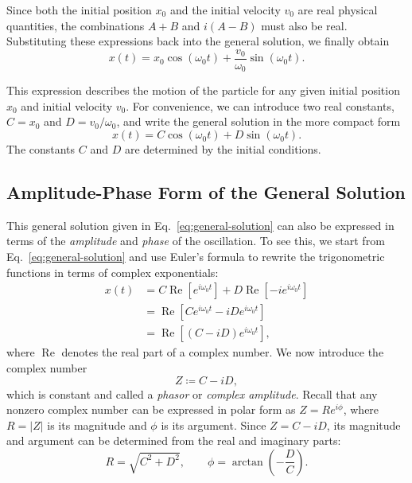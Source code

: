 \documentclass[12pt]{article}
\begin{document}
Since both the initial position $x_0$ and the initial velocity $v_0$ are real physical quantities, the combinations $A+B$ and $i(A-B)$ must also be real. Substituting these expressions back into the general solution, we finally obtain
\begin{equation}
    x(t)=x_0\cos(\omega_0 t)
    +\frac{v_0}{\omega_0}\sin(\omega_0 t).
\end{equation}

This expression describes the motion of the particle
for any given initial position $x_0$ and initial
velocity $v_0$. For convenience, we can introduce two real constants,
$C=x_0$ and $D=v_0/\omega_0$, and write the general
solution in the more compact form
\begin{equation}
    x(t)=C\cos(\omega_0 t)+D\sin(\omega_0 t).
    \label{eq:general-solution}
\end{equation}
The constants $C$ and $D$ are determined by the initial conditions. 

\subsection{Amplitude-Phase Form of the General Solution}

This general solution given in Eq.~\ref{eq:general-solution} can also be expressed in terms of the \emph{amplitude} and \emph{phase} of the oscillation. To see this, we start from Eq.~\ref{eq:general-solution} and use Euler's formula to rewrite the trigonometric functions in terms of complex exponentials:
\begin{align}
    x(t)
    &=C\operatorname{Re}\left[e^{i\omega_0 t}\right]+D\operatorname{Re}\left[-i e^{i\omega_0 t}\right]\nonumber\\
    &=\operatorname{Re}\left[
    Ce^{i\omega_0 t}-iDe^{i\omega_0 t}
    \right]\nonumber\\
    &=\operatorname{Re}\left[
    (C-iD)e^{i\omega_0 t}
    \right],
\end{align}
where $\operatorname{Re}$ denotes the real part of a complex number. We now introduce the complex number
\begin{equation}
    Z\coloneqq C-iD,
\end{equation}
which is constant and called a \emph{phasor} or \emph{complex amplitude}. Recall that any nonzero complex number can be expressed in polar form as $Z=Re^{i\phi}$, where $R=|Z|$ is its magnitude and $\phi$ is its argument. Since $Z=C-iD$, its magnitude and argument can be determined from the real and imaginary parts:
\begin{equation}
    R=\sqrt{C^2+D^2},\qquad 
    \phi=\arctan\left(-\frac{D}{C}\right).
\end{equation}
\end{document}

